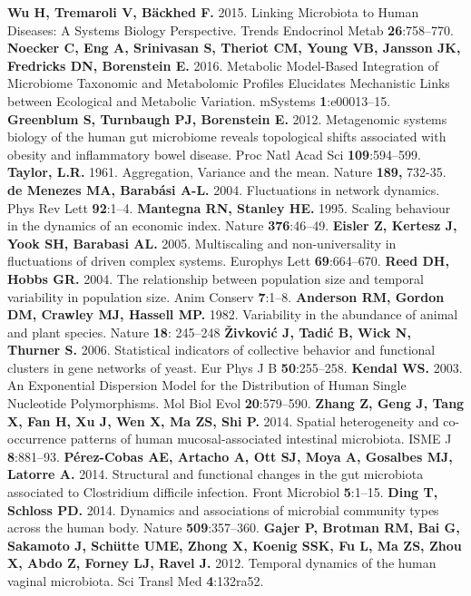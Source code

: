 \documentclass[12pt,oneside,letterpaper]{article}
\begin{document}
\begin{thebibliography}{99}
 {\bf Wu H, Tremaroli V, Bäckhed F.} 2015. Linking Microbiota to Human Diseases: A Systems Biology Perspective. Trends Endocrinol Metab {\bf 26}:758–770.
 {\bf Noecker C, Eng A, Srinivasan S, Theriot CM, Young VB, Jansson JK, Fredricks DN, Borenstein E.} 2016. Metabolic Model-Based Integration of Microbiome Taxonomic and Metabolomic Profiles Elucidates Mechanistic Links between Ecological and Metabolic Variation. mSystems {\bf 1}:e00013–15.
 {\bf Greenblum S, Turnbaugh PJ, Borenstein E.} 2012. Metagenomic systems biology of the human gut microbiome reveals topological shifts associated with obesity and inflammatory bowel disease. Proc Natl Acad Sci {\bf 109}:594–599.
 {\bf Taylor, L.R.} 1961. Aggregation, Variance and the mean. Nature {\bf 189,} 732-35.
 {\bf de Menezes MA, Barabási A-L.} 2004. Fluctuations in network dynamics. Phys Rev Lett {\bf 92}:1–4.
 {\bf Mantegna RN, Stanley HE.} 1995. Scaling behaviour in the dynamics of an economic index. Nature {\bf 376}:46–49.
 {\bf Eisler Z, Kertesz J, Yook SH, Barabasi AL.} 2005. Multiscaling and non-universality in fluctuations of driven complex systems. Europhys Lett {\bf 69}:664–670.
 {\bf Reed DH, Hobbs GR.} 2004. The relationship between population size and temporal variability in population size. Anim Conserv {\bf 7}:1–8.
 {\bf Anderson RM, Gordon DM, Crawley MJ, Hassell MP.} 1982. Variability in the abundance of animal and plant species. Nature {\bf 18}: 245–248
 {\bf Živković J, Tadić B, Wick N, Thurner S.} 2006. Statistical indicators of collective behavior and functional clusters in gene networks of yeast. Eur Phys J B {\bf 50}:255–258.
 {\bf Kendal WS.} 2003. An Exponential Dispersion Model for the Distribution of Human Single Nucleotide Polymorphisms. Mol Biol Evol {\bf 20}:579–590.
 {\bf Zhang Z, Geng J, Tang X, Fan H, Xu J, Wen X, Ma ZS, Shi P.} 2014. Spatial heterogeneity and co-occurrence patterns of human mucosal-associated intestinal microbiota. ISME J {\bf 8}:881–93.
 {\bf Pérez-Cobas AE, Artacho A, Ott SJ, Moya A, Gosalbes MJ, Latorre A.} 2014. Structural and functional changes in the gut microbiota associated to Clostridium difficile infection. Front Microbiol {\bf 5}:1–15.
 {\bf Ding T, Schloss PD.} 2014. Dynamics and associations of microbial community types across the human body. Nature {\bf 509}:357–360.
 {\bf Gajer P, Brotman RM, Bai G, Sakamoto J, Schütte UME, Zhong X, Koenig SSK, Fu L, Ma ZS, Zhou X, Abdo Z, Forney LJ, Ravel J.} 2012. Temporal dynamics of the human vaginal microbiota. Sci Transl Med {\bf 4}:132ra52.

\end{thebibliography}
\end{document}
